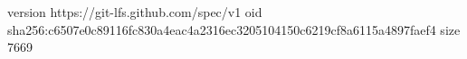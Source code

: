 version https://git-lfs.github.com/spec/v1
oid sha256:c6507e0c89116fc830a4eac4a2316ec3205104150c6219cf8a6115a4897faef4
size 7669

